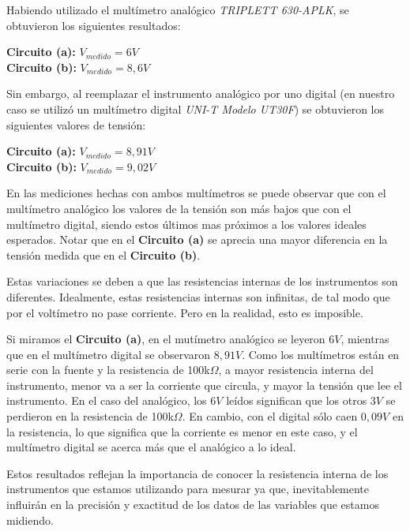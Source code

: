 \documentclass{article}
\begin{document}
\noindent Habiendo utilizado el multímetro analógico \textit{TRIPLETT 630-APLK}, se obtuvieron los siguientes resultados:
\bigskip

	\indent \textbf{Circuito (a):} $V_{medido} = 6V$ \smallskip\\
	\indent \textbf{Circuito (b):} $V_{medido} = 8,6V$ \\
	\medskip

	Sin embargo, al reemplazar el instrumento analógico por uno digital (en nuestro caso se utilizó un multímetro digital \textit{UNI-T Modelo UT30F}) se obtuvieron los siguientes valores de tensión:
\bigskip

	\indent \textbf{Circuito (a):} $V_{medido} = 8,91V$ \smallskip\\
	\indent \textbf{Circuito (b):} $V_{medido} = 9,02V$ \\
	\bigskip



\newpage
	En las mediciones hechas con ambos multímetros se puede observar que con el multímetro analógico los valores de la tensión son más bajos que con el multímetro digital, siendo estos últimos mas próximos a los valores ideales esperados. Notar que en el \textbf{Circuito (a)} se aprecia una mayor diferencia en la tensión medida que en el \textbf{Circuito (b)}.
	\par
	Estas variaciones se deben a que las resistencias internas de los instrumentos son diferentes. Idealmente, estas resistencias internas son infinitas, de tal modo que por el voltímetro no pase corriente. Pero en la realidad, esto es imposible.
	\par
	Si miramos el \textbf{Circuito (a)}, en el mutímetro analógico se leyeron $6V$, mientras que en el multímetro digital se observaron $8,91V$. Como los multímetros están en serie con la fuente y la resistencia de 100k$\Omega$, a mayor resistencia interna del instrumento, menor va a ser la corriente que circula, y mayor la tensión que lee el instrumento. En el caso del analógico, los $6V$ leídos significan que los otros $3V$ se perdieron en la resistencia de 100k$\Omega$. En cambio, con el digital sólo caen $0,09V$ en la resistencia, lo que significa que la corriente es menor en este caso, y el multímetro digital se acerca más que el analógico a lo ideal.
	\par
	Estos resultados reflejan la importancia de conocer la resistencia interna de los instrumentos que estamos utilizando para mesurar ya que, inevitablemente influirán en la precisión y exactitud de los datos de las variables que estamos midiendo.
\bigskip
\end{document}
